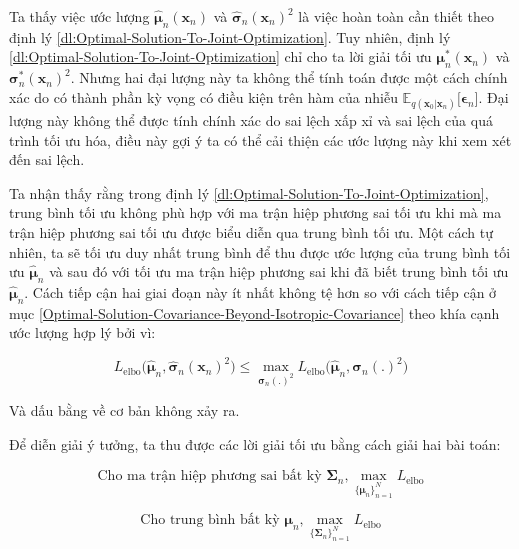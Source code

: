 \documentclass[14pt, a4paper]{article}
\numberwithin{equation}{section}
\numberwithin{figure}{section}
\numberwithin{dl}{section}
\numberwithin{md}{section}
\numberwithin{bd}{section}
\numberwithin{dn}{section}
\numberwithin{hq}{section}
\begin{document}
    Ta thấy việc ước lượng $\hat{\boldsymbol{\mu}}_n (\boldsymbol{x}_n)$ và $\hat{\boldsymbol{\sigma}}_n (\boldsymbol{x}_n)^2$ là việc hoàn toàn cần thiết theo định lý \ref{dl:Optimal-Solution-To-Joint-Optimization}.
    Tuy nhiên, định lý \ref{dl:Optimal-Solution-To-Joint-Optimization} chỉ cho ta lời giải tối ưu $\boldsymbol{\mu}_n^{\ast} (\boldsymbol{x}_n)$ và $\boldsymbol{\sigma}_n^{\ast} (\boldsymbol{x}_n)^2$.
    Nhưng hai đại lượng này ta không thể tính toán được một cách chính xác do có thành phần kỳ vọng có điều kiện trên hàm của nhiễu $\mathbb{E}_{q(\boldsymbol{x}_0 \vert \boldsymbol{x}_n)} \lbrack \boldsymbol{\epsilon}_n \rbrack$.
    Đại lượng này không thể được tính chính xác do sai lệch xấp xỉ và sai lệch của quá trình tối ưu hóa,
    điều này gợi ý ta có thể cải thiện các ước lượng này khi xem xét đến sai lệch.

    Ta nhận thấy rằng trong định lý \ref{dl:Optimal-Solution-To-Joint-Optimization}, trung bình tối ưu không phù hợp với ma trận hiệp phương sai tối ưu khi mà ma trận hiệp phương sai tối ưu được biểu diễn qua trung bình tối ưu.
    Một cách tự nhiên, ta sẽ tối ưu duy nhất trung bình để thu được ước lượng của trung bình tối ưu $\hat{\boldsymbol{\mu}}_n$ và sau đó với tối ưu ma trận hiệp phương sai khi đã biết trung bình tối ưu $\hat{\boldsymbol{\mu}}_n$.
    Cách tiếp cận hai giai đoạn này ít nhất không tệ hơn so với cách tiếp cận ở mục \ref{Optimal-Solution-Covariance-Beyond-Isotropic-Covariance} theo khía cạnh ước lượng hợp lý bởi vì:

    \begin{equation}
        L_{\mathrm{elbo}}\big( \hat{\boldsymbol{\mu}}_n, \hat{\boldsymbol{\sigma}}_n (\boldsymbol{x}_n)^2 \big) \leq \max_{\boldsymbol{\sigma}_n (.)^2 } L_{\mathrm{elbo}} \big( \hat{\boldsymbol{\mu}}_n, \boldsymbol{\sigma}_n (.)^2 \big)
    \end{equation}

    Và dấu bằng về cơ bản không xảy ra.

    Để diễn giải ý tưởng, ta thu được các lời giải tối ưu bằng cách giải hai bài toán:

    \begin{equation} \label{eq:Arbitrary-Covariance-Optimize-Mean}
        \text{Cho ma trận hiệp phương sai bất kỳ } \boldsymbol{\Sigma}_n, \max_{\lbrace \boldsymbol{\mu}_n \rbrace_{n=1}^N} L_{\mathrm{elbo}}
    \end{equation}

    \begin{equation} \label{eq:Arbitrary-Mean-Optimize-Covariance}
        \text{Cho trung bình bất kỳ } \boldsymbol{\mu}_n, \max_{\lbrace \boldsymbol{\Sigma}_n \rbrace_{n=1}^N} L_{\mathrm{elbo}}
    \end{equation}
\end{document}
